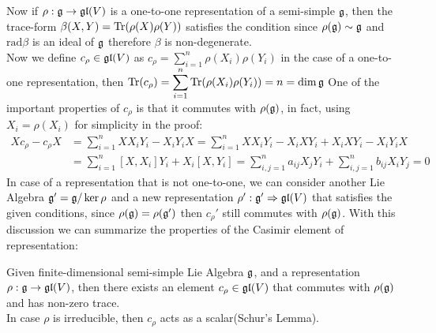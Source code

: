 Now if $\rho:\mathfrak{g} \rightarrow \mathfrak{gl}(V)$ is a one-to-one representation of a semi-simple $\mathfrak{g}$, then the trace-form $\beta(X,Y)=\text{Tr}(\rho(X)\rho(Y))$ satisfies the condition since $\rho(\mathfrak{g}) \sim \mathfrak{g}$ and $\text{rad} \beta$ is an ideal of $\mathfrak{g}$ therefore $\beta$ is non-degenerate.\\
Now we define $c_\rho \in \mathfrak{gl}(V)$ as $c_\rho = \displaystyle\sum_{i=1}^n \rho(X_i)\rho(Y_i)$ in the case of a one-to-one representation, then $\text{Tr}(c_\rho) = \displaystyle \sum_{i=1}^n\text{Tr}(\rho(X_i)\rho(Y_i))= n = \dim \mathfrak{g}$
One of the important properties of $c_\rho$ is that it commutes with $\rho(\mathfrak{g})$, in fact, using $X_i=\rho(X_i)$ for simplicity in the proof:
\begin{align*}
Xc_\rho - c_\rho X &= \sum_{i=1}^n XX_iY_i - X_iY_iX = \sum_{i=1}^nXX_iY_i - X_iXY_i + X_iXY_i - X_iY_iX  \\
&=  \sum_{i=1}^n [X,X_i]Y_i + X_i[X,Y_i] = \sum_{i,j=1}^n a_{ij}X_jY_i + \sum_{i,j=1}^n b_{ij}X_iY_j = 0
\end{align*}
In case of a representation that is not one-to-one, we can consider another Lie Algebra $\mathfrak{g}'=\mathfrak{g}/\ker \rho$ and a new representation $\rho': \mathfrak{g}' \Rightarrow \mathfrak{gl}(V)$ that satisfies the given conditions, since $\rho(\mathfrak{g})=\rho(\mathfrak{g}')$ then $c_\rho'$ still commutes with $\rho(\mathfrak{g})$.
With this discussion we can summarize the properties of the Casimir element of representation:
\begin{prop}
Given finite-dimensional semi-simple Lie Algebra $\mathfrak{g}$, and a representation $\rho:\mathfrak{g}\rightarrow \mathfrak{gl}(V)$, then there exists an element $c_\rho \in \mathfrak{gl}(V)$ that commutes with $\rho(\mathfrak{g})$ and has non-zero trace.\\
In case $\rho$ is irreducible, then $c_\rho$ acts as a scalar(Schur's Lemma).
\end{prop}
